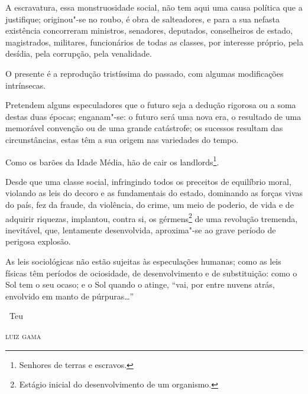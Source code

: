 A escravatura, essa monstruosidade social, não tem aqui uma causa
política que a justifique; originou"-se no roubo, é obra de salteadores,
e para a sua nefasta existência concorreram ministros, senadores,
deputados, conselheiros de estado, magistrados, militares, funcionários
de todas as classes, por interesse próprio, pela desídia, pela
corrupção, pela venalidade.

O presente é a reprodução tristíssima do passado, com algumas
modificações intrínsecas.

Pretendem alguns especuladores que o futuro seja a dedução rigorosa ou a
soma destas duas épocas; enganam"-se: o futuro será uma nova era, o
resultado de uma memorável convenção ou de uma grande catástrofe; os
sucessos resultam das circunstâncias, estas têm a sua origem nas
variedades do tempo.

Como os barões da Idade Média, hão de cair os landlords\footnote{
  Senhores de terras e escravos.}.

Desde que uma classe social, infringindo todos os preceitos de
equilíbrio moral, violando as leis do decoro e as fundamentais do
estado, dominando as forças vivas do país, fez da fraude, da violência,
do crime, um meio de poderio, de vida e de adquirir riquezas, implantou,
contra si, os gérmens\footnote{Estágio inicial do desenvolvimento de
  um organismo.} de uma
revolução tremenda, inevitável, que, lentamente desenvolvida,
aproxima"-se ao grave período de perigosa explosão.

As leis sociológicas não estão sujeitas às especulações humanas; como as
leis físicas têm períodos de ociosidade, de desenvolvimento e de
substituição: como o Sol tem o seu ocaso; e o Sol quando o atinge, ``vai,
por entre nuvens atrás, envolvido em manto de púrpuras\ldots{}''

\vfill

\hfill\ Teu

\hfill\textsc{luiz gama}

\pagebreak
\mbox{}\vfill
\thispagestyle{empty}

